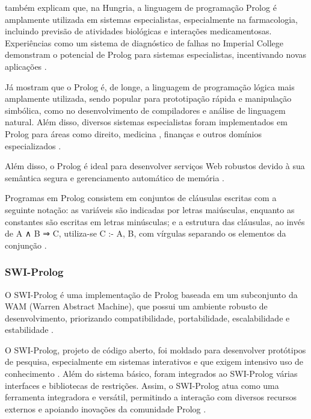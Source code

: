 \textcite{keithclark} também explicam que, na Hungria, a linguagem de programação Prolog é amplamente utilizada em sistemas especialistas, especialmente na farmacologia, incluindo previsão de atividades biológicas e interações medicamentosas. Experiências como um sistema de diagnóstico de falhas no Imperial College demonstram o potencial de Prolog para sistemas especialistas, incentivando novas aplicações \cite{keithclark} .

Já \textcite{stuartrussel} mostram que o Prolog é, de longe, a linguagem de programação lógica mais amplamente utilizada, sendo popular para prototipação rápida e manipulação simbólica, como no desenvolvimento de compiladores e análise de linguagem natural. Além disso, diversos sistemas especialistas foram implementados em Prolog para áreas como direito, medicina \cite{jimmysingla}, finanças e outros domínios especializados \cite{stuartrussel}.

Além disso, o Prolog é ideal para desenvolver serviços Web robustos devido à sua semântica segura e gerenciamento automático de memória \cite{wielemaker}.

Programas em Prolog consistem em conjuntos de cláusulas escritas com a seguinte notação:  as variáveis são indicadas por letras maiúsculas, enquanto as constantes são escritas em letras minúsculas; e  a estrutura das cláusulas, ao invés de A ∧ B ⇒ C, utiliza-se C :- A, B, com vírgulas separando os elementos da conjunção \cite{stuartrussel}.

\subsubsection{SWI-Prolog}

O SWI-Prolog é uma implementação de Prolog baseada em um subconjunto da WAM (Warren Abstract Machine), que possui um ambiente robusto de desenvolvimento, priorizando compatibilidade, portabilidade, escalabilidade e estabilidade \cite{wielemakerswiprolog}. 

O SWI-Prolog, projeto de código aberto, foi moldado para desenvolver protótipos de pesquisa, especialmente em sistemas interativos e que exigem intensivo uso de conhecimento \cite{wielemakerswiprolog2}. Além do sistema básico, foram integrados ao SWI-Prolog várias interfaces e bibliotecas de restrições. Assim, o SWI-Prolog atua como uma ferramenta integradora e versátil, permitindo a interação com diversos recursos externos e apoiando inovações da comunidade Prolog \cite{wielemakerswiprolog2}.

